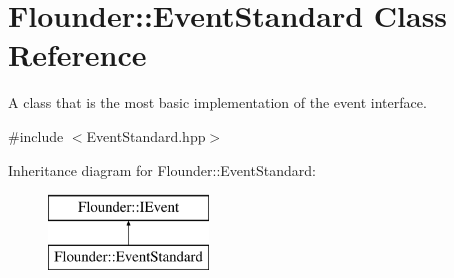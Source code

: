 \hypertarget{class_flounder_1_1_event_standard}{}\section{Flounder\+:\+:Event\+Standard Class Reference}
\label{class_flounder_1_1_event_standard}


A class that is the most basic implementation of the event interface.  




{\ttfamily \#include $<$Event\+Standard.\+hpp$>$}

Inheritance diagram for Flounder\+:\+:Event\+Standard\+:\begin{figure}[H]
\begin{center}
\leavevmode
\includegraphics[height=2.000000cm]{class_flounder_1_1_event_standard}
\end{center}
\end{figure}
